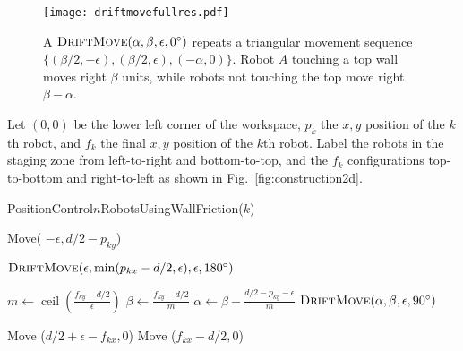 \begin{figure}
\begin{center}
	\texttt{[image: driftmovefullres.pdf]}
\end{center}
\vspace{-1em}
\caption{\label{fig:driftmove}
A  $\text{\sc DriftMove}(\alpha, \beta, \epsilon,0^\circ)$ repeats a triangular movement sequence $\{ (\beta/2,-\epsilon),(\beta/2,\epsilon),(-\alpha,0)\}$. Robot $A$ touching a top wall moves right $\beta$ units, while robots not touching the top move right $\beta-\alpha$.}
\vspace{-1em}
\end{figure}

Let $(0,0)$ be the lower left corner of the workspace, $p_k$ the $x,y$ position of the $k$th robot, and $f_k$ the final $x,y$ position of the $k$th robot. Label the robots in the staging zone from left-to-right and bottom-to-top, and the $f_k$ configurations top-to-bottom and right-to-left as shown in Fig.~\ref{fig:construction2d}.

\begin{algorithm}
\caption{PositionControl$n$RobotsUsingWallFriction($k$)}\label{alg:PosControlNRobots}
\begin{algorithmic}[1]
\State Move( $-\epsilon, d/2-p_{ky}$) %


\State $\text{\sc DriftMove}(\epsilon, \min(p_{kx} - d/2,\epsilon), \epsilon,180^\circ)$    %
\EndWhile

\State $m \gets \operatorname{ceil}(\frac{f_{ky}-d/2}{\epsilon})$
\State $\beta \gets \frac{f_{ky}-d/2}{m}$
\State $\alpha \gets \beta - \frac{d/2 - p_{ky}-\epsilon}{m}$
\State $\text{\sc DriftMove}(\alpha, \beta, \epsilon,90^\circ)$    %
\EndFor

\State Move ($d/2+\epsilon-f_{kx}, 0$)  %
\State Move ($f_{kx}-d/2, 0$)  

\end{algorithmic}
\end{algorithm}


